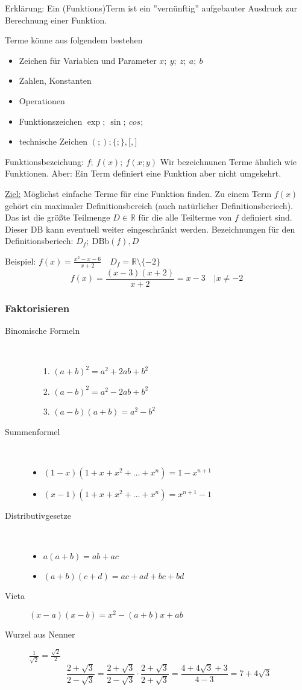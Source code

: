 Erklärung: Ein (Funktions)Term ist ein ''vernünftig'' aufgebauter Ausdruck zur Berechnung einer Funktion.

Terme könne aus folgendem bestehen
\begin{itemize}
    \item Zeichen für Variablen und Parameter $x;\ y;\ z;\ a;\ b$
    \item Zahlen, Konstanten
    \item Operationen
    \item Funktionszeichen $\exp;\ \sin;\ cos;\ $
    \item technische Zeichen $(;);\lbrace;\rbrace,\lbrack,\rbrack$
\end{itemize}
Funktionsbezeichung: $f;\ f(x);\ f(x;y)$ Wir bezeichnunen Terme ähnlich wie Funktionen. Aber: Ein Term definiert eine Funktion aber nicht umgekehrt.


\underline{Ziel:} Möglichst einfache Terme für eine Funktion finden. Zu einem Term $f(x)$ gehört ein maximaler Definitionsbereich (auch natürlicher Definitionsberiech). Das ist die größte Teilmenge $D \in \mathbb{R}$ für die alle Teilterme von $f$ definiert sind. Dieser DB kann eventuell weiter eingeschränkt werden. Bezeichnungen für den Definitionsberiech: $D_f;\ \textrm{DBb}(f), D$


Beispiel: $f(x) = \frac{x^2-x-6}{x+2}\quad D_f=\mathbb{R}\setminus\lbrace-2\rbrace$
$$f(x)= \frac{(x-3)(x+2)}{x+2} = x-3\quad | x \not = -2$$

\subsubsection{Faktorisieren}
\begin{description}
    \item[Binomische Formeln] \
    \begin{itemize}
        \item[1.] $(a+b)^2=a^2+2ab+b^2$
        \item[2.] $(a-b)^2=a^2-2ab+b^2$
        \item[3.] $(a-b)(a+b)=a^2-b^2$
    \end{itemize}
    \item[Summenformel] \
    \begin{itemize}
        \item $(1-x)(1+x+x^2+\dots +x^n)=1-x^{n+1}$
        \item $(x-1)(1+x+x^2+\dots +x^n)=x^{n+1}-1$
    \end{itemize}
    \item[Distributivgesetze] \
    \begin{itemize}
        \item $a(a+b)=ab+ac$
        \item $(a+b)(c+d) = ac +ad + bc +bd$
    \end{itemize}
    \item[Vieta] $(x-a)(x-b) = x^2 - (a+b)x+ab$
    \item[Wurzel aus Nenner] $\frac{1}{\sqrt{2}}=\frac{\sqrt{2}}{2}$
    $$\frac{2+\sqrt{3}}{2-\sqrt{3}}=\frac{2+\sqrt{3}}{2-\sqrt{3}} \cdot \frac{2+\sqrt{3}}{2+\sqrt{3}}=\frac{4+4\sqrt{3}+3}{4-3}=7+4\sqrt{3}$$
\end{description}